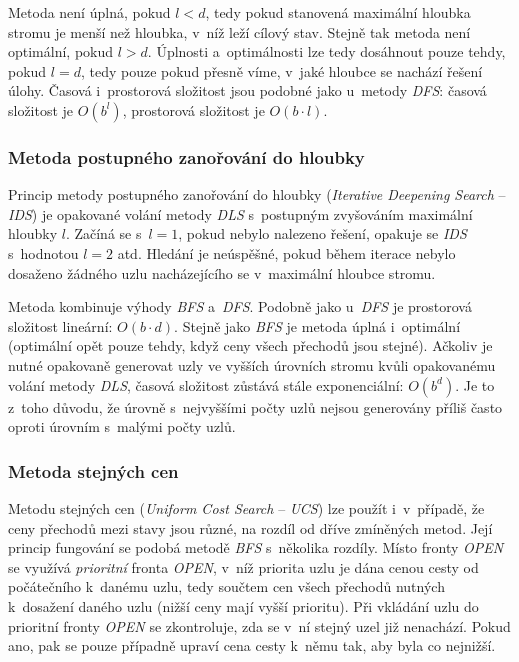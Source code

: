 Metoda není úplná, pokud $l < d$, tedy pokud stanovená maximální hloubka stromu je menší než hloubka, v~níž leží cílový stav. Stejně tak metoda není optimální, pokud $l > d$. Úplnosti a~optimálnosti lze tedy dosáhnout pouze tehdy, pokud $l = d$, tedy pouze pokud přesně víme, v~jaké hloubce se nachází řešení úlohy. Časová i~prostorová složitost jsou podobné jako u~metody \emph{DFS}: časová složitost je $O(b^l)$, prostorová složitost je $O(b \cdot l)$.

\subsubsection*{Metoda postupného zanořování do hloubky}

Princip metody postupného zanořování do hloubky (\emph{Iterative Deepening Search} -- \emph{IDS}) \cite{AI_Russel_Norvig} je opakované volání metody \emph{DLS} s~postupným zvyšováním maximální hloubky $l$. Začíná se s~$l = 1$, pokud nebylo nalezeno řešení, opakuje se \emph{IDS} s~hodnotou $l = 2$ atd. Hledání je neúspěšné, pokud během iterace nebylo dosaženo žádného uzlu nacházejícího se v~maximální hloubce stromu.

Metoda kombinuje výhody \emph{BFS} a~\emph{DFS}. Podobně jako u~\emph{DFS} je prostorová složitost lineární: $O(b \cdot d)$. Stejně jako \emph{BFS} je metoda úplná i~optimální (optimální opět pouze tehdy, když ceny všech přechodů jsou stejné). Ačkoliv je nutné opakovaně generovat uzly ve vyšších úrovních stromu kvůli opakovanému volání metody \emph{DLS}, časová složitost zůstává stále exponenciální: $O(b^d)$. Je to z~toho důvodu, že úrovně s~nejvyššími počty uzlů nejsou generovány příliš často oproti úrovním s~malými počty uzlů.

\subsubsection*{Metoda stejných cen}

Metodu stejných cen (\emph{Uniform Cost Search} -- \emph{UCS}) \cite{AI_Russel_Norvig} lze použít i~v~případě, že ceny přechodů mezi stavy jsou různé, na rozdíl od dříve zmíněných metod. Její princip fungování se podobá metodě \emph{BFS} s~několika rozdíly. Místo fronty \emph{OPEN} se využívá \emph{prioritní} fronta \emph{OPEN}, v~níž priorita uzlu je dána cenou cesty od počátečního k~danému uzlu, tedy součtem cen všech přechodů nutných k~dosažení daného uzlu (nižší ceny mají vyšší prioritu). Při vkládání uzlu do prioritní fronty \emph{OPEN} se zkontroluje, zda se v~ní stejný uzel již nenachází. Pokud ano, pak se pouze případně upraví cena cesty k~němu tak, aby byla co nejnižší.

